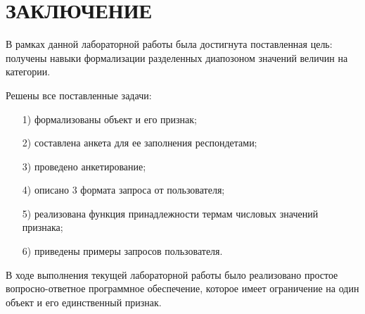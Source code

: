 {\centering \chapter*{ЗАКЛЮЧЕНИЕ}}

В рамках данной лабораторной работы была достигнута поставленная цель: получены навыки формализации разделенных диапозоном значений величин на категории.

Решены все поставленные задачи:
\begin{enumerate}
	\item[1)] формализованы объект и его признак;
	\item[2)] составлена анкета для ее заполнения респондетами;
	\item[3)] проведено анкетирование;
	\item[4)] описано 3 формата запроса от пользователя;
	\item[5)] реализована функция принадлежности термам числовых значений признака;
	\item[6)] приведены примеры запросов пользователя.
\end{enumerate}

В ходе выполнения текущей лабораторной работы было реализовано простое вопросно-ответное программное обеспечение, которое имеет ограничение на один объект и его единственный признак.